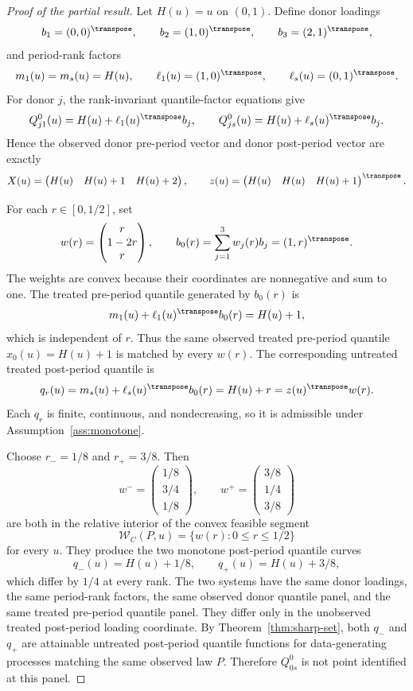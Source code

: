 \begin{proof}[Proof of the partial result]
Let \(H(u)=u\) on \((0,1)\).  Define donor loadings
\[
b_1=(0,0)^\transpose,\qquad b_2=(1,0)^\transpose,\qquad b_3=(2,1)^\transpose,
\]
and period-rank factors
\[
m_1(u)=m_s(u)=H(u),\qquad \ell_1(u)=(1,0)^\transpose,\qquad \ell_s(u)=(0,1)^\transpose .
\]
For donor \(j\), the rank-invariant quantile-factor equations give
\[
Q^0_{j1}(u)=H(u)+\ell_1(u)^\transpose b_j,\qquad
Q^0_{js}(u)=H(u)+\ell_s(u)^\transpose b_j.
\]
Hence the observed donor pre-period vector and donor post-period vector are exactly
\[
X(u)=\begin{pmatrix}H(u)&H(u)+1&H(u)+2\end{pmatrix},\qquad
z(u)=\begin{pmatrix}H(u)&H(u)&H(u)+1\end{pmatrix}^\transpose .
\]

For each \(r\in[0,1/2]\), set
\[
w(r)=\begin{pmatrix}r\\ 1-2r\\ r\end{pmatrix},\qquad b_0(r)=\sum_{j=1}^3 w_j(r)b_j=(1,r)^\transpose .
\]
The weights are convex because their coordinates are nonnegative and sum to one.  The treated pre-period quantile generated by \(b_0(r)\) is
\[
m_1(u)+\ell_1(u)^\transpose b_0(r)=H(u)+1,
\]
which is independent of \(r\).  Thus the same observed treated pre-period quantile \(x_0(u)=H(u)+1\) is matched by every \(w(r)\).  The corresponding untreated treated post-period quantile is
\[
q_r(u)=m_s(u)+\ell_s(u)^\transpose b_0(r)=H(u)+r=z(u)^\transpose w(r).
\]
Each \(q_r\) is finite, continuous, and nondecreasing, so it is admissible under Assumption~\ref{ass:monotone}.

Choose \(r_- =1/8\) and \(r_+=3/8\).  Then
\[
w^-=\begin{pmatrix}1/8\\3/4\\1/8\end{pmatrix},\qquad
w^+=\begin{pmatrix}3/8\\1/4\\3/8\end{pmatrix}
\]
are both in the relative interior of the convex feasible segment
\[
\mathcal{W}_C(P,u)=\{w(r):0\le r\le 1/2\}
\]
for every \(u\).  They produce the two monotone post-period quantile curves
\[
q_-(u)=H(u)+1/8,\qquad q_+(u)=H(u)+3/8,
\]
which differ by \(1/4\) at every rank.  The two systems have the same donor loadings, the same period-rank factors, the same observed donor quantile panel, and the same treated pre-period quantile panel.  They differ only in the unobserved treated post-period loading coordinate.  By Theorem~\ref{thm:sharp-set}, both \(q_-\) and \(q_+\) are attainable untreated post-period quantile functions for data-generating processes matching the same observed law \(P\).  Therefore \(Q^0_{0s}\) is not point identified at this panel.


\end{proof}
